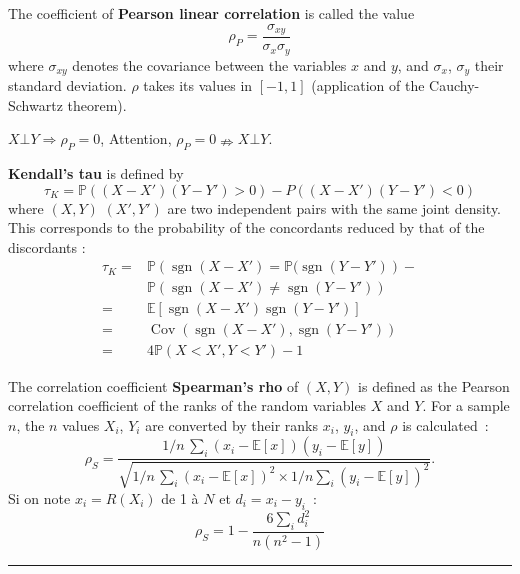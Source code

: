 \begin{f}

The coefficient of \textbf{Pearson linear correlation} is called the value
\[
\rho_P = \frac{\sigma_{xy}}{\sigma_x \sigma_y}
\]
where \(\sigma_{xy}\) denotes the covariance between the variables \(x\) and \(y\), and \(\sigma_x\), \(\sigma_y\) their standard deviation.
\(\rho\) takes its values in \([-1,1]\) (application of the Cauchy-Schwartz theorem).

\(X\bot Y \Rightarrow \rho_P=0\), Attention, \(\rho_P=0 \nRightarrow X\bot Y \). 


 

\textbf{Kendall's tau} is defined by
\[
\tau_K=\mathbb{P}((X-X')(Y-Y')>0)-P((X-X')(Y-Y')<0)
\]
where \((X,Y)\)  \((X',Y')\) are two independent pairs with the same joint density. This corresponds to the probability of the concordants reduced by that of the discordants :
\begin{align*}
\tau_K	=&\mathbb{P}\left(\operatorname{sgn}(X-X')=\mathbb{P}(\operatorname{sgn}(Y-Y')\right)-\\
		&\mathbb{P}\left(\operatorname{sgn}(X-X')\neq \operatorname{sgn}(Y-Y')\right)\\
=&\mathbb{E}\left[ \operatorname{sgn}(X-X')\operatorname{sgn}(Y-Y')\right]\\
=&\operatorname{Cov}(\operatorname{sgn}(X-X'),\operatorname{sgn}(Y-Y'))\\
=&4\mathbb{P}(X<X',Y<Y')-1 
\end{align*}

The correlation coefficient \textbf{Spearman's rho} of \((X,Y)\) is defined as the Pearson correlation coefficient of the ranks of the random variables \(X\) and \(Y\).
For a sample \(n\), the \(n\) values \(X_i\), \(Y_i\) are converted by their ranks \(x_i\), \(y_i\), and \(\rho\) is calculated~:
\[
\rho_S = \frac{1/n\,\sum_i(x_i-\mathbb{E}[x])(y_i-\mathbb{E}[y])}{\sqrt{1/n\,\sum_i (x_i-\mathbb{E}[x])^2 \times 1/n\sum_i(y_i-\mathbb{E}[y])^2}}.
\]
Si on note \(x_i= R(X_i)\) de 1 à \(N\) et  \(d_i = x_i - y_i\)~:
\[    \rho_S = 1- {\frac {6 \sum_i d_i^2}{n(n^2 - 1)}}\]

\end{f}
\hrule

